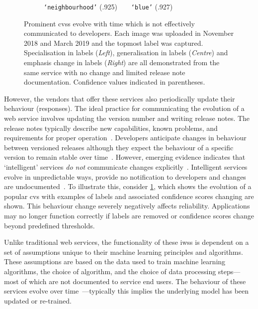 {\begin{landscape}
\begin{figure}[th]
\begin{subfigure}{.3\linewidth}
        \caption{\footnotesize \texttt{`neighbourhood'} (.925)~~\ra{}~~\texttt{`blue'} (.927)}
    \end{subfigure}
    \caption[Prominent computer vision service evolution]{Prominent \glspl{cvs} evolve with time which is not effectively communicated to developers. Each image was uploaded in November 2018 and March 2019 and the topmost label was captured. Specialisation in labels (\textit{Left}), generalisation in labels (\textit{Centre}) and emphasis change in labels (\textit{Right}) are all demonstrated from the same service with no  change and limited release note documentation. Confidence values indicated in parentheses.}
    \label{fig:labelchanges}
\end{figure}
\end{landscape}}

However, the vendors that offer these services also periodically update their behaviour (responses). The ideal practice for communicating the evolution of a web service involves updating the version number and writing release notes. The release notes typically describe new capabilities, known problems, and requirements for proper operation~\citep{SWEBOK}. Developers anticipate changes in behaviour between versioned releases although they expect the behaviour of a specific version to remain stable over time~\citep{vasa2010growth}. However, emerging evidence indicates that `intelligent' services \textit{do not} communicate changes explicitly~\citep{Cummaudo:2019esem}. Intelligent services evolve in unpredictable ways, provide no notification to developers and changes are undocumented~\citep{Cummaudo:2020icse}. To illustrate this, consider \cref{fig:labelchanges}, which shows the evolution of a popular \gls{cvs} with examples of labels and associated confidence scores changing are shown. This behaviour change severely negatively affects reliability. Applications may no longer function correctly if labels are removed or confidence scores change beyond predefined thresholds. 

Unlike traditional web services, the functionality of these \glspl{iws} is dependent on a set of assumptions unique to their machine learning principles and algorithms. These assumptions are based on the data used to train machine learning algorithms, the choice of algorithm, and the choice of data processing steps---most of which are not documented to service end users. The behaviour of these services evolve over time~\citep{Cummaudo:2019icsme}---typically this  implies the underlying model has been updated or re-trained. 

